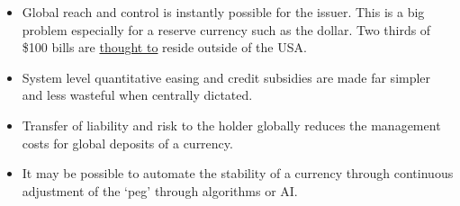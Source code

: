 \begin{itemize}
\item Global reach and control is instantly possible for the issuer. This is a big problem especially for a reserve currency such as the dollar. Two thirds of \$100 bills are \href{https://www.federalreserve.gov/pubs/ifdp/2012/1058/default.htm}{thought to} reside outside of the USA.
\item System level quantitative easing and credit subsidies are made far simpler and less wasteful when centrally dictated.
\item Transfer of liability and risk to the holder globally reduces the management costs for global deposits of a currency. 
\item It may be possible to automate the stability of a currency through continuous adjustment of the `peg' through algorithms or AI.
\end{itemize}

